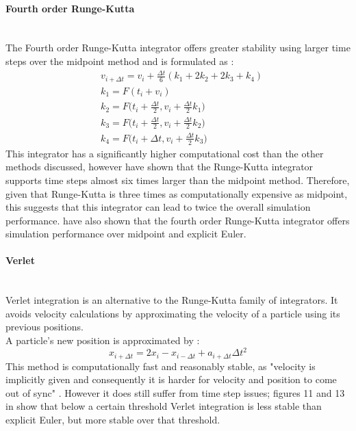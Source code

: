 \paragraph{Fourth order Runge-Kutta}\leavevmode\\
The Fourth order Runge-Kutta integrator offers greater stability using larger time steps over the midpoint method and is formulated as \parencite[3]{Wang2009a}:
\begin{equation}
\begin{split}
\label{eq:4th order rk}
  &v_{i + \Delta t} = v_{i} + \frac{\Delta t}{6}(k_{1} + 2k_{2} + 2k_{3} +  k_{4})
  \\&k_{1} = F(t_{i} + v_{i})
  \\&k_{2} = F\bigg(t_{i} + \frac{\Delta t}{2}, v_{i} + \frac{\Delta t}{2}k_{1}\bigg)
  \\&k_{3} = F\bigg(t_{i} + \frac{\Delta t}{2}, v_{i} + \frac{\Delta t}{2}k_{2}\bigg)
  \\&k_{4} = F\bigg(t_{i} + \Delta t, v_{i} + \frac{\Delta t}{2}k_{3}\bigg)
\end{split}
\end{equation}
This integrator has a significantly higher computational cost than the other methods discussed, however \textcite[4]{Volino2001} have shown that the Runge-Kutta integrator supports time steps almost six times larger than the midpoint method. Therefore, given that Runge-Kutta is three times as computationally expensive as midpoint, this suggests that this integrator can lead to twice the overall simulation performance. \textcite[4]{Wang2009a} have also shown that the fourth order Runge-Kutta integrator offers simulation performance over midpoint and explicit Euler.

\paragraph{Verlet}\leavevmode\\
Verlet integration is an alternative to the Runge-Kutta family of integrators. It avoids velocity calculations by approximating the velocity of a particle using its previous positions.
\\A particle's new position is approximated by \parencite[2]{Mongus2012}:
\begin{equation}
\label{eq:verlet}
  x_{i + \Delta t} = 2x_{i} - x_{i - \Delta t} + a_{i + \Delta t}\Delta t^{2}
\end{equation}
This method is computationally fast and reasonably stable, as "velocity is implicitly given and consequently it is harder for velocity and position to come out of sync" \parencite[1]{Jakobsen2005}. However it does still suffer from time step issues; figures 11 and 13 in \textcite[14-15]{Wacker2005a} show that below a certain threshold Verlet integration is less stable than explicit Euler, but more stable over that threshold.

